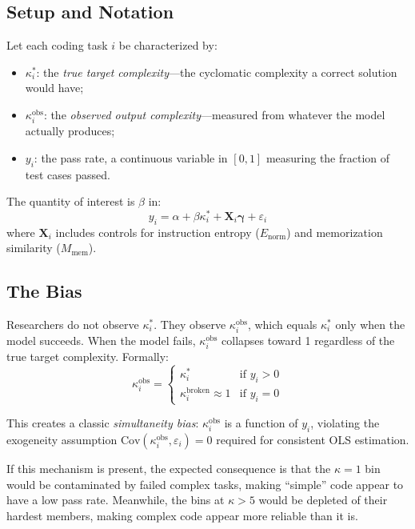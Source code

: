 \documentclass[conference]{IEEEtran}
\begin{document}
\subsection{Setup and Notation}

Let each coding task $i$ be characterized by:
\begin{itemize}
    \item $\kappa_i^*$: the \emph{true target complexity}---the cyclomatic complexity a correct solution would have;
    \item $\kappa_i^{\text{obs}}$: the \emph{observed output complexity}---measured from whatever the model actually produces;
    \item $y_i$: the pass rate, a continuous variable in $[0, 1]$ measuring the fraction of test cases passed.
\end{itemize}

The quantity of interest is $\beta$ in:
\begin{equation}
    y_i = \alpha + \beta \kappa_i^* + \mathbf{X}_i \boldsymbol{\gamma} + \varepsilon_i
    \label{eq:structural}
\end{equation}
where $\mathbf{X}_i$ includes controls for instruction entropy ($E_{\text{norm}}$) and memorization similarity ($M_{\text{mem}}$).

\subsection{The Bias}

Researchers do not observe $\kappa_i^*$. They observe $\kappa_i^{\text{obs}}$, which equals $\kappa_i^*$ only when the model succeeds. When the model fails, $\kappa_i^{\text{obs}}$ collapses toward 1 regardless of the true target complexity. Formally:
\begin{equation}
    \kappa_i^{\text{obs}} = 
    \begin{cases}
        \kappa_i^* & \text{if } y_i > 0 \\
        \kappa_i^{\text{broken}} \approx 1 & \text{if } y_i = 0
    \end{cases}
\end{equation}

This creates a classic \emph{simultaneity bias}: $\kappa_i^{\text{obs}}$ is a function of $y_i$, violating the exogeneity assumption $\text{Cov}(\kappa_i^{\text{obs}}, \varepsilon_i) = 0$ required for consistent OLS estimation.

If this mechanism is present, the expected consequence is that the $\kappa = 1$ bin would be contaminated by failed complex tasks, making ``simple'' code appear to have a low pass rate. Meanwhile, the bins at $\kappa > 5$ would be depleted of their hardest members, making complex code appear more reliable than it is.
\end{document}

